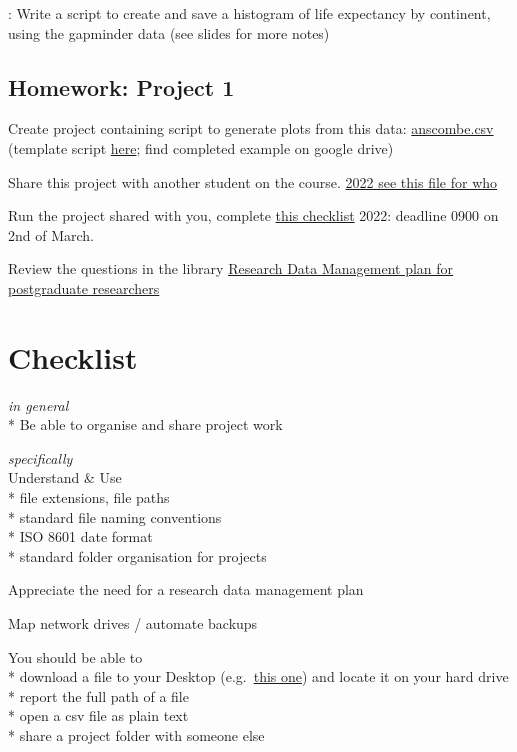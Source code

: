 \documentclass[
]{book}
\begin{document}
: Write a script to create and save a histogram of life expectancy by continent, using the gapminder data (see slides for more notes)

\hypertarget{homework-project-1}{%
\subsection{Homework: Project 1}\label{homework-project-1}}

Create project containing script to generate plots from this data: \href{static/anscombe.csv}{anscombe.csv} (template script \href{static/project1.R}{here}; find completed example on google drive)

Share this project with another student on the course. \href{https://docs.google.com/spreadsheets/d/1gDbF07ekkz19HshAiDpZ6iu_y5iOKWrpyXDQKElV794/edit?usp=sharing}{2022 see this file for who}

Run the project shared with you, complete \href{https://docs.google.com/forms/d/e/1FAIpQLSdfOtUIUEs66W0nSqrHTHrMT-iubygdAhNFhUwbu0kOLZIMeA/viewform?usp=sf_link}{this checklist} 2022: deadline 0900 on 2nd of March.

Review the questions in the library \href{https://docs.google.com/document/d/1rHXl2LYhgv7zeuwc5fDRMyqSgE3OaLa8/edit?usp=sharing\&ouid=109750001665912327637\&rtpof=true\&sd=true}{Research Data Management plan for postgraduate researchers}

\hypertarget{checklist-2}{%
\section{Checklist}\label{checklist-2}}

\emph{in general}\\
* Be able to organise and share project work

\emph{specifically}\\
Understand \& Use\\
* file extensions, file paths\\
* standard file naming conventions\\
* ISO 8601 date format\\
* standard folder organisation for projects

Appreciate the need for a research data management plan

Map network drives / automate backups

You should be able to\\
* download a file to your Desktop (e.g.~\href{static/anscombe.csv}{this one}) and locate it on your hard drive\\
* report the full path of a file\\
* open a csv file as plain text\\
* share a project folder with someone else
\end{document}
